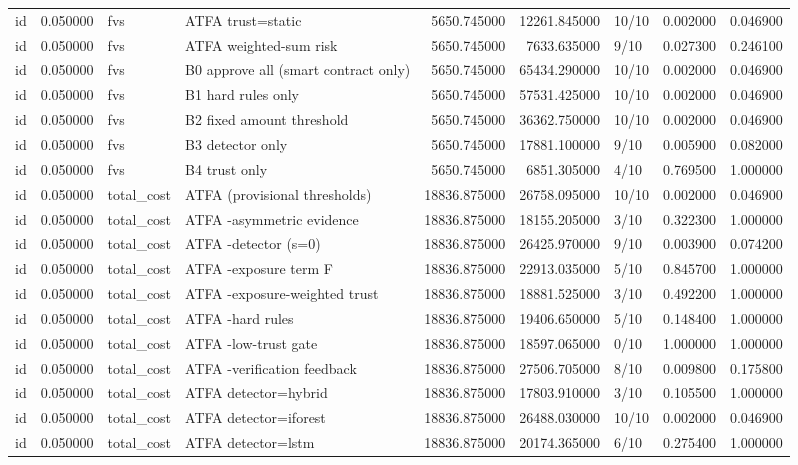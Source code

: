 \begin{tabular}{lrllrrlrr}
id & 0.050000 & fvs & ATFA trust=static & 5650.745000 & 12261.845000 & 10/10 & 0.002000 & 0.046900 \\
id & 0.050000 & fvs & ATFA weighted-sum risk & 5650.745000 & 7633.635000 & 9/10 & 0.027300 & 0.246100 \\
id & 0.050000 & fvs & B0 approve all (smart contract only) & 5650.745000 & 65434.290000 & 10/10 & 0.002000 & 0.046900 \\
id & 0.050000 & fvs & B1 hard rules only & 5650.745000 & 57531.425000 & 10/10 & 0.002000 & 0.046900 \\
id & 0.050000 & fvs & B2 fixed amount threshold & 5650.745000 & 36362.750000 & 10/10 & 0.002000 & 0.046900 \\
id & 0.050000 & fvs & B3 detector only & 5650.745000 & 17881.100000 & 9/10 & 0.005900 & 0.082000 \\
id & 0.050000 & fvs & B4 trust only & 5650.745000 & 6851.305000 & 4/10 & 0.769500 & 1.000000 \\
id & 0.050000 & total\_cost & ATFA (provisional thresholds) & 18836.875000 & 26758.095000 & 10/10 & 0.002000 & 0.046900 \\
id & 0.050000 & total\_cost & ATFA -asymmetric evidence & 18836.875000 & 18155.205000 & 3/10 & 0.322300 & 1.000000 \\
id & 0.050000 & total\_cost & ATFA -detector (s=0) & 18836.875000 & 26425.970000 & 9/10 & 0.003900 & 0.074200 \\
id & 0.050000 & total\_cost & ATFA -exposure term F & 18836.875000 & 22913.035000 & 5/10 & 0.845700 & 1.000000 \\
id & 0.050000 & total\_cost & ATFA -exposure-weighted trust & 18836.875000 & 18881.525000 & 3/10 & 0.492200 & 1.000000 \\
id & 0.050000 & total\_cost & ATFA -hard rules & 18836.875000 & 19406.650000 & 5/10 & 0.148400 & 1.000000 \\
id & 0.050000 & total\_cost & ATFA -low-trust gate & 18836.875000 & 18597.065000 & 0/10 & 1.000000 & 1.000000 \\
id & 0.050000 & total\_cost & ATFA -verification feedback & 18836.875000 & 27506.705000 & 8/10 & 0.009800 & 0.175800 \\
id & 0.050000 & total\_cost & ATFA detector=hybrid & 18836.875000 & 17803.910000 & 3/10 & 0.105500 & 1.000000 \\
id & 0.050000 & total\_cost & ATFA detector=iforest & 18836.875000 & 26488.030000 & 10/10 & 0.002000 & 0.046900 \\
id & 0.050000 & total\_cost & ATFA detector=lstm & 18836.875000 & 20174.365000 & 6/10 & 0.275400 & 1.000000 \\

\end{tabular}
